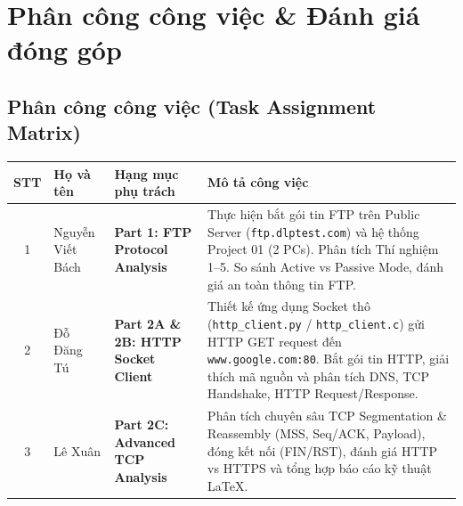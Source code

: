 \documentclass[12pt,a4paper]{article}
\begin{document}
\clearpage
\hypersetup{pageanchor=true}
\pagestyle{reportstyle}
\setcounter{page}{1}

\tableofcontents
\clearpage

\section{Phân công công việc \& Đánh giá đóng góp}

\subsection{Phân công công việc (Task Assignment Matrix)}
\begin{center}
  \footnotesize
  \begin{tabularx}{\textwidth}{@{} c p{3.2cm} p{3.8cm} X @{}}
    \toprule
    \textbf{STT} & \textbf{Họ và tên} & \textbf{Hạng mục phụ trách} & \textbf{Mô tả công việc} \\
    \midrule
    1 & Nguyễn Viết Bách & \textbf{Part 1: FTP Protocol Analysis} &
    Thực hiện bắt gói tin FTP trên Public Server (\texttt{ftp.dlptest.com}) và hệ thống Project 01 (2 PCs). Phân tích Thí nghiệm 1--5. So sánh Active vs Passive Mode, đánh giá an toàn thông tin FTP. \\
    \midrule
    2 & Đỗ Đăng Tú & \textbf{Part 2A \& 2B: HTTP Socket Client} &
    Thiết kế ứng dụng Socket thô (\texttt{http\_client.py} / \texttt{http\_client.c}) gửi HTTP GET request đến \texttt{www.google.com:80}. Bắt gói tin HTTP, giải thích mã nguồn và phân tích DNS, TCP Handshake, HTTP Request/Response. \\
    \midrule
    3 & Lê Xuân & \textbf{Part 2C: Advanced TCP Analysis} &
    Phân tích chuyên sâu TCP Segmentation \& Reassembly (MSS, Seq/ACK, Payload), đóng kết nối (FIN/RST), đánh giá HTTP vs HTTPS và tổng hợp báo cáo kỹ thuật LaTeX. \\
    \bottomrule
  \end{tabularx}
  \vspace{0.15cm}
  \label{tab:task_assignment}
\end{center}
\end{document}
